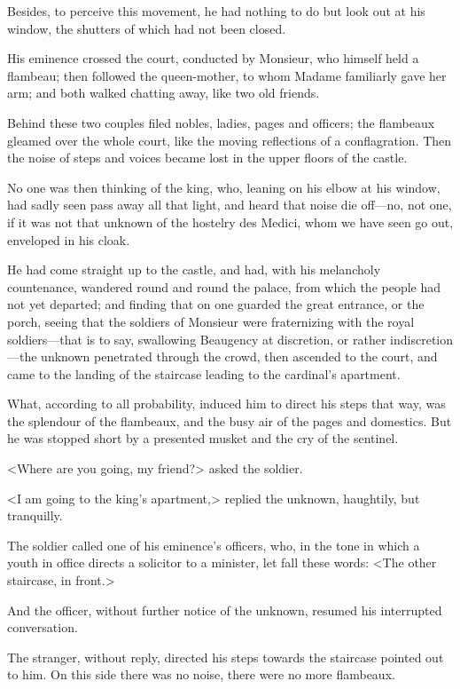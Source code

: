 Besides, to perceive this movement, he had nothing to do but look out at his window, the shutters of which had not been closed.

His eminence crossed the court, conducted by Monsieur, who himself held a flambeau; then followed the queen-mother, to whom Madame familiarly gave her arm; and both walked chatting away, like two old friends.

Behind these two couples filed nobles, ladies, pages and officers; the flambeaux gleamed over the whole court, like the moving reflections of a conflagration. Then the noise of steps and voices became lost in the upper floors of the castle.

No one was then thinking of the king, who, leaning on his elbow at his window, had sadly seen pass away all that light, and heard that noise die off—no, not one, if it was not that unknown of the hostelry des Medici, whom we have seen go out, enveloped in his cloak.

He had come straight up to the castle, and had, with his melancholy countenance, wandered round and round the palace, from which the people had not yet departed; and finding that on one guarded the great entrance, or the porch, seeing that the soldiers of Monsieur were fraternizing with the royal soldiers—that is to say, swallowing Beaugency at discretion, or rather indiscretion—the unknown penetrated through the crowd, then ascended to the court, and came to the landing of the staircase leading to the cardinal's apartment.

What, according to all probability, induced him to direct his steps that way, was the splendour of the flambeaux, and the busy air of the pages and domestics. But he was stopped short by a presented musket and the cry of the sentinel.

<Where are you going, my friend?> asked the soldier.

<I am going to the king's apartment,> replied the unknown, haughtily, but tranquilly.

The soldier called one of his eminence's officers, who, in the tone in which a youth in office directs a solicitor to a minister, let fall these words: <The other staircase, in front.>

And the officer, without further notice of the unknown, resumed his interrupted conversation.

The stranger, without reply, directed his steps towards the staircase pointed out to him. On this side there was no noise, there were no more flambeaux.

